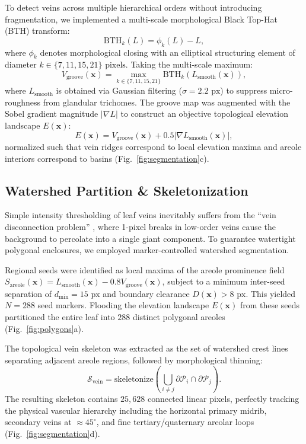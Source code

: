 \documentclass[10pt,twocolumn]{article}
\begin{document}
To detect veins across multiple hierarchical orders without introducing fragmentation, we implemented a multi-scale morphological Black Top-Hat (BTH) transform:
\begin{equation}
    \mathrm{BTH}_k(L) = \phi_k(L) - L,
\end{equation}
where $\phi_k$ denotes morphological closing with an elliptical structuring element of diameter $k \in \{7, 11, 15, 21\}\text{ pixels}$. Taking the multi-scale maximum:
\begin{equation}
    V_{\mathrm{groove}}(\mathbf{x}) = \max_{k \in \{7, 11, 15, 21\}} \mathrm{BTH}_k(L_{\mathrm{smooth}}(\mathbf{x})),
\end{equation}
where $L_{\mathrm{smooth}}$ is obtained via Gaussian filtering ($\sigma = 2.2\text{ px}$) to suppress micro-roughness from glandular trichomes. The groove map was augmented with the Sobel gradient magnitude $|\nabla L|$ to construct an objective topological elevation landscape $E(\mathbf{x})$:
\begin{equation}
    E(\mathbf{x}) = V_{\mathrm{groove}}(\mathbf{x}) + 0.5 |\nabla L_{\mathrm{smooth}}(\mathbf{x})|,
\end{equation}
normalized such that vein ridges correspond to local elevation maxima and areole interiors correspond to basins (Fig.~\ref{fig:segmentation}c).

\subsection{Watershed Partition \& Skeletonization}
Simple intensity thresholding of leaf veins inevitably suffers from the ``vein disconnection problem'' \cite{price2011leaf}, where 1-pixel breaks in low-order veins cause the background to percolate into a single giant component. To guarantee watertight polygonal enclosures, we employed marker-controlled watershed segmentation.

Regional seeds were identified as local maxima of the areole prominence field $S_{\mathrm{areole}}(\mathbf{x}) = L_{\mathrm{smooth}}(\mathbf{x}) - 0.8 V_{\mathrm{groove}}(\mathbf{x})$, subject to a minimum inter-seed separation of $d_{\mathrm{min}} = 15\text{ px}$ and boundary clearance $D(\mathbf{x}) > 8\text{ px}$. This yielded $N = 288$ seed markers. Flooding the elevation landscape $E(\mathbf{x})$ from these seeds partitioned the entire leaf into $288$ distinct polygonal areoles (Fig.~\ref{fig:polygons}a).

The topological vein skeleton was extracted as the set of watershed crest lines separating adjacent areole regions, followed by morphological thinning:
\begin{equation}
    \mathcal{S}_{\mathrm{vein}} = \mathrm{skeletonize}\left( \bigcup_{i \neq j} \partial \mathcal{P}_i \cap \partial \mathcal{P}_j \right).
\end{equation}
The resulting skeleton contains $25,628$ connected linear pixels, perfectly tracking the physical vascular hierarchy including the horizontal primary midrib, secondary veins at $\approx 45^\circ$, and fine tertiary/quaternary areolar loops (Fig.~\ref{fig:segmentation}d).
\end{document}
